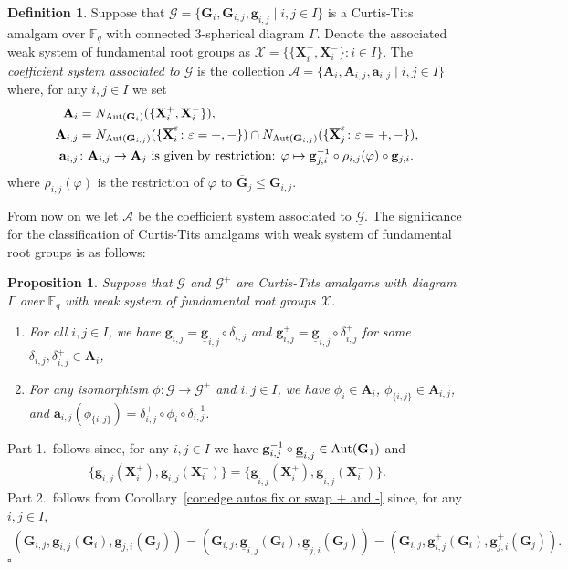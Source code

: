 \documentclass[12pt]{amsart}
\newtheorem{proposition}[theorem]{Proposition}
\theoremstyle{definition}
\newtheorem{definition}[theorem]{Definition}
\newcommand{\bpf}{\noindent{\bf Proof}\hspace{7pt}}
\newcommand{\epf}{\qed}
\newcommand{\bpr}{\begin{proposition}}
\newcommand{\epr}{\end{proposition}}
\newcommand{\bde}{\begin{definition}}
\newcommand{\ede}{\end{definition}}
\newcommand{\ul}{\underline}
\newcommand{\Aut}{\mathop{\rm Aut}\nolimits}
\renewcommand{\bar}{\overline}
\newcommand{\FF}{{\mathbb F}}
\newcommand{\dfn}{\em}
\newcommand{\after}{\mathbin{ \circ }}
\newcommand{\Chi}{{\mathcal X}}
\newcommand{\vep}{\varepsilon}
\renewcommand{\qed}{\hfill $\square$}
\newcommand{\amgrpA}{{\mathbf{A}}}
\newcommand{\amgrpG}{{\mathbf{G}}}
\newcommand{\amgrpX}{{\mathbf{X}}}
\newcommand{\ama}{{\mathbf a}}
\newcommand{\amg}{{\mathbf g}}
\newcommand{\famg}{\ul{\mathbf g}}
\newcommand{\bamgrpG}{\bar{\amgrpG}}
\newcommand{\bamgrpX}{\bar{\amgrpX}}
\newcommand{\amA}{{\mathscr{A}}}
\newcommand{\famG}{\ul{\mathscr{G}}}
\newcommand{\amG}{{\mathscr{G}}}
\newcommand{\liediag}{\Gamma}
\begin{document}
\bde\label{dfn:coefficient system}
Suppose that $\amG=\{\amgrpG_i,\amgrpG_{i,j},\amg_{i,j}\mid i,j\in I\}$ is a  Curtis-Tits amalgam over $\FF_q$ with connected $3$-spherical diagram $\liediag$.
Denote the associated weak system of fundamental root groups as $\Chi=\{\{\amgrpX_i^+,\amgrpX_i^-\}\colon i\in I\}$.
The {\dfn coefficient system associated to $\amG$} is the collection 
 $\amA=\{\amgrpA_i,\amgrpA_{i,j},\ama_{i,j}\mid i,j\in I\}$ where, for any $i,j\in I$ we set 
 \begin{align*}
 \amgrpA_i&=N_{\Aut(\amgrpG_i)}(\{\amgrpX_i^+,\amgrpX_i^-\}), \\
 \amgrpA_{i,j}&=N_{\Aut(\amgrpG_{i,j})}(\{\bamgrpX_i^\vep \colon\vep=+,-\})\cap N_{\Aut(\amgrpG_{i,j})}(\{\bamgrpX_j^\vep \colon\vep=+,-\}), \\
 \ama_{i,j}&\colon \amgrpA_{i,j}\to\amgrpA_j \mbox{ is given by restriction: } \varphi\mapsto \amg_{j,i}^{-1}\after \rho_{i,j}(\varphi)\after\amg_{j,i}.
  \end{align*}
where $\rho_{i,j}(\varphi)$ is the restriction of $\varphi$ to $\bamgrpG_j\le \amgrpG_{i,j}$.
\ede

From now on we let $\amA$ be the coefficient system associated to $\famG$.
The significance for the classification of  Curtis-Tits amalgams with weak system of fundamental root groups is as follows:
\bpr\label{prop:coefficient systems}
Suppose that $\amG$ and $\amG^+$ are  Curtis-Tits amalgams with diagram $\liediag$ over $\FF_q$ with weak system of fundamental root groups $\Chi$.
\begin{enumerate}
\item For all $i,j\in I$, we have $\amg_{i,j}=\famg_{i,j}\after\delta_{i,j}$ and $\amg_{i,j}^+=\famg_{i,j}\after\delta_{i,j}^+$ for some $\delta_{i,j}, \delta_{i,j}^+\in \amgrpA_i$,
\item For any isomorphism $\phi\colon \amG\to\amG^+$ and $i,j\in I$, we have $\phi_i\in \amgrpA_i$, $\phi_{\{i,j\}}\in \amgrpA_{i,j}$, and $\ama_{i,j}(\phi_{\{i,j\}})=\delta_{i,j}^+\after\phi_i\after\delta_{i,j}^{-1}$.
\end{enumerate}
\epr
\bpf
Part 1.~follows since, for any $i,j\in I$ we have $\amg_{i,j}^{-1}\after\famg_{i,j}\in \Aut(\amgrpG_1)$ and  
\begin{align*}
\{\amg_{i,j}(\amgrpX_i^+),\amg_{i,j}(\amgrpX_i^-)\}=\{\famg_{i,j}(\amgrpX_i^+),\famg_{i,j}(\amgrpX_i^-)\}.
\end{align*}
Part 2.~follows from Corollary~\ref{cor:edge autos fix or swap + and -} since, for any $i,j\in I$,  
\begin{align*}
(\amgrpG_{i,j},\amg_{i,j}(\amgrpG_i),\amg_{j,i}(\amgrpG_j))
=(\amgrpG_{i,j},\famg_{i,j}(\amgrpG_i),\famg_{j,i}(\amgrpG_j)) =(\amgrpG_{i,j},\amg^+_{i,j}(\amgrpG_i),\amg^+_{j,i}(\amgrpG_j)).
\end{align*}
\epf
\end{document}
